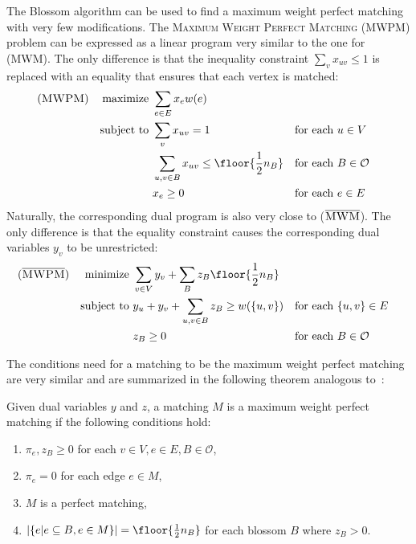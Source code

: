 The Blossom algorithm can be used to find a maximum weight perfect matching with very few modifications. The \textsc{Maximum Weight Perfect Matching} \textsc{(MWPM)} problem can be expressed as a linear program very similar to the one for \textsc{(MWM)}. The only difference is that the inequality constraint $\sum_v x_{uv} \leq 1$ is replaced with an equality that ensures that each vertex is matched:
\begin{align*}
(\textsc{MWPM})
&& \text{maximize }   & \sum_{e \in E} x_e w(e)\\
&& \text{subject to } & \sum_v x_{uv} = 1                                    && \text{for each $u \in V$} \\
&&                    & \sum_{u, v \in B} x_{uv} \leq \floor{\frac{1}{2}n_B} && \text{for each $B \in \mathcal{O}$} \\
&&                    & x_e \geq 0                                           && \text{for each $e \in E$}
\end{align*}
Naturally, the corresponding dual program is also very close to ($\overline{\textsc{MWM}}$). The only difference is that the equality constraint causes the corresponding dual variables $y_v$ to be unrestricted:
\begin{align*}
(\overline{\textsc{MWPM}})
&& \text{minimize }   & \sum_{v\in V}y_v + \sum_{B} z_B \floor{\frac{1}{2}n_B} \\
&& \text{subject to } & y_u + y_v + \sum_{u, v \in B} z_B \geq w(\{u, v\}) && \text{for each $\{u, v\} \in E$} \\
&&                    & z_B \geq 0                                   && \text{for each $B \in \mathcal{O}$}
\end{align*}

The conditions need for a matching to be the maximum weight perfect matching are very similar and are summarized in the following theorem analogous to~:

\begin{theorem}\label{thm:conditions_perfect}
    Given dual variables $y$ and $z$, a matching $M$ is a maximum weight perfect matching if the following conditions hold:
    
    \begin{enumerate}
        \item $\pi_{e}, z_B \geq 0$ for each $v \in V, e \in E, B \in \mathcal{O}$,
        \item $\pi_{e} = 0$ for each edge $e \in M$,
        \item $M$ is a perfect matching,
        \item $|\{e | e \subseteq B, e \in M\}| = \floor{\frac{1}{2}n_B}$ for each blossom $B$ where $z_B > 0$.
    \end{enumerate}
\end{theorem}

